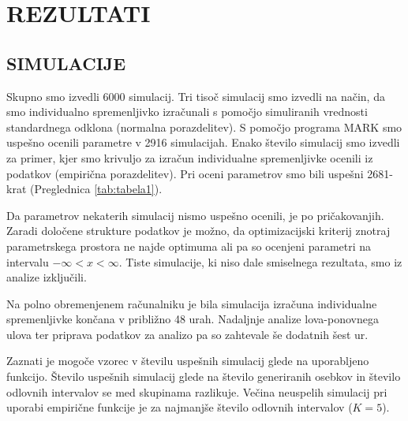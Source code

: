 \section{REZULTATI}

\subsection{SIMULACIJE}
Skupno smo izvedli 6000 simulacij. Tri tisoč simulacij smo izvedli na način, da smo individualno spremenljivko izračunali s pomočjo simuliranih vrednosti standardnega odklona (normalna porazdelitev). S pomočjo programa MARK smo uspešno ocenili parametre v 2916 simulacijah.
Enako število simulacij smo izvedli za primer, kjer smo krivuljo za izračun individualne spremenljivke ocenili iz podatkov (empirična porazdelitev). Pri oceni parametrov smo bili uspešni 2681-krat (Preglednica \ref{tab:tabela1}).

Da parametrov nekaterih simulacij nismo uspešno ocenili, je po pričakovanjih. Zaradi določene strukture podatkov je možno, da optimizacijski kriterij znotraj parametrskega prostora ne najde optimuma ali pa so ocenjeni parametri na intervalu $- \infty < x < \infty$. Tiste simulacije, ki niso dale smiselnega rezultata, smo iz analize izključili.

Na polno obremenjenem računalniku je bila simulacija izračuna individualne spremenljivke končana v približno 48 urah. Nadaljnje analize lova-ponovnega ulova ter priprava podatkov za analizo pa so zahtevale še dodatnih šest ur.

Zaznati je mogoče vzorec v številu uspešnih simulacij glede na uporabljeno funkcijo. Število uspešnih simulacij glede na število generiranih osebkov in število odlovnih intervalov se med skupinama razlikuje. Večina neuspelih simulacij pri uporabi empirične funkcije je za najmanjše število odlovnih intervalov ($K=5$).


